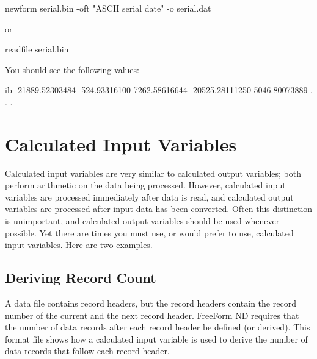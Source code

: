 \begin{example}
newform serial.bin -oft "ASCII serial date" -o serial.dat 
\end{example}

or 

\begin{example}
readfile serial.bin 
\end{example}

You should see the following values: 

\begin{vcode}{ib}
-21889.52303484
  -524.93316100
  7262.58616644
-20525.28111250
  5046.80073889
  .
  .
  .
\end{vcode}
 
\section{Calculated Input Variables}
\label{ff,convvars,calcinp}

Calculated input variables are very similar to calculated output
variables; both perform arithmetic on the data being processed.
However, calculated input variables are processed immediately after
data is read, and calculated output variables are processed after
input data has been converted.  Often this distinction is unimportant,
and calculated output variables should be used whenever possible.  Yet
there are times you must use, or would prefer to use, calculated input
variables.  Here are two examples.

\subsection{Deriving Record Count}

A data file contains record headers, but the record headers contain
the record number of the current and the next record header. FreeForm
ND requires that the number of data records after each record header
be defined (or derived).  This format file shows how a calculated
input variable is used to derive the number of data records that
follow each record header.

